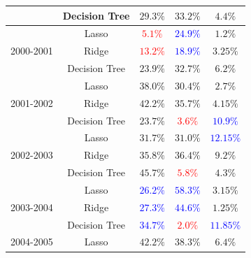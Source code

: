 \documentclass[11pt]{article}
\begin{document}
{\begin{table}[p]
\begin{tabular}{|c|c|c|c|c|}
      \cline{2-5}
                                 & Decision Tree & $29.3\%$                   & $33.2\%$                   & $4.4\%$                     \\
      \hline
      \multirow{3}{*}{2000-2001} & Lasso         & \textcolor{red}{$5.1\%$}   & \textcolor{blue}{$24.9\%$} & $1.2\%$                     \\
      \cline{2-5}
                                 & Ridge         & \textcolor{red}{$13.2\%$}  & \textcolor{blue}{$18.9\%$} & $3.25\%$                    \\
      \cline{2-5}
                                 & Decision Tree & $23.9\%$                   & $32.7\%$                   & $6.2\%$                     \\
      \hline
      \multirow{3}{*}{2001-2002} & Lasso         & $38.0\%$                   & $30.4\%$                   & $2.7\%$                     \\
      \cline{2-5}
                                 & Ridge         & $42.2\%$                   & $35.7\%$                   & $4.15\%$                    \\
      \cline{2-5}
                                 & Decision Tree & $23.7\%$                   & \textcolor{red}{$3.6\%$}   & \textcolor{blue}{$10.9\%$}  \\
      \hline
      \multirow{3}{*}{2002-2003} & Lasso         & $31.7\%$                   & $31.0\%$                   & \textcolor{blue}{$12.15\%$} \\
      \cline{2-5}
                                 & Ridge         & $35.8\%$                   & $36.4\%$                   & $9.2\%$                     \\
      \cline{2-5}
                                 & Decision Tree & $45.7\%$                   & \textcolor{red}{$5.8\%$}   & $4.3\%$                     \\
      \hline
      \multirow{3}{*}{2003-2004} & Lasso         & \textcolor{blue}{$26.2\%$} & \textcolor{blue}{$58.3\%$} & $3.15\%$                    \\
      \cline{2-5}
                                 & Ridge         & \textcolor{blue}{$27.3\%$} & \textcolor{blue}{$44.6\%$} & $1.25\%$                    \\
      \cline{2-5}
                                 & Decision Tree & \textcolor{blue}{$34.7\%$} & \textcolor{red}{$2.0\%$}   & \textcolor{blue}{$11.85\%$} \\
      \hline
      \multirow{3}{*}{2004-2005} & Lasso         & $42.2\%$                   & $38.3\%$                   & $6.4\%$                     \\

\end{tabular}
\end{table}}
\end{document}
